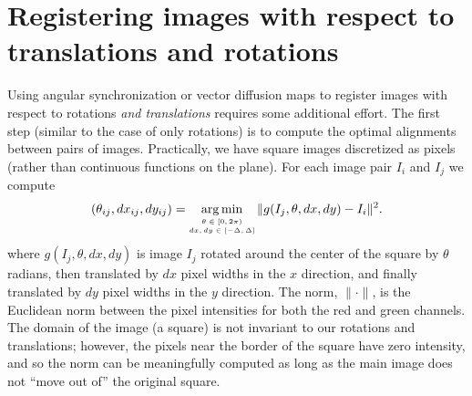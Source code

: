 \documentclass{pnastwo}
\DeclareMathOperator*{\argmin}{arg\,min}
\begin{document}
\section{Registering images with respect to translations and rotations} \label{subsec:trans_rot_register}

Using angular synchronization or vector diffusion maps to register images with respect to rotations {\it and translations} requires some additional effort.
%
%
%
The first step (similar to the case of only rotations) is to compute the optimal alignments between pairs of images.
%
Practically, we have square images discretized as pixels (rather than continuous functions on the plane).
%
For each image pair $I_i$ and $I_j$ we compute
\begin{equation}\label{eq:opt_pairwise}
(\theta_{ij}, dx_{ij}, dy_{ij}) = \argmin_{
\scriptsize \begin{matrix}
\theta \in [0, 2\pi) \\
dx, dy \in [-\Delta, \Delta]\\
\end{matrix}
} \|g(I_j, \theta, dx, dy) - I_i \|^2.
\end{equation}
where $g(I_j, \theta, dx, dy)$ is image $I_j$ rotated around the center of the square by $\theta$ radians, then translated by $dx$ pixel widths in the $x$ direction, and finally translated by $dy$ pixel widths in the $y$ direction.
%
The norm, $\| \cdot \|$, is the Euclidean norm between the pixel intensities for both the red and green channels.
%
The domain of the image (a square) is not invariant to our rotations and translations; however, the pixels near the border of the square have zero intensity, and so the norm can be meaningfully computed as long as the main image does not ``move out of'' the original square.
%
\end{document}
